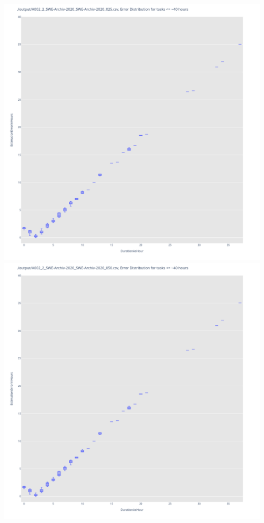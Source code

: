 \includegraphics[width=\textwidth]{Scripts/output/A002_2_SWE-Archiv-2020_SWE-Archiv-2020_025.csv.error_distribution.png}
\includegraphics[width=\textwidth]{Scripts/output/A002_2_SWE-Archiv-2020_SWE-Archiv-2020_050.csv.error_distribution.png}
